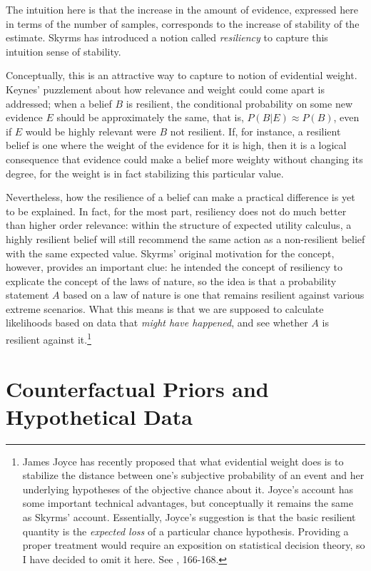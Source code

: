 The intuition here is that the increase in the amount of evidence,
expressed here in terms of the number of samples, corresponds to the
increase of stability of the estimate. Skyrms has introduced a notion
called \emph{resiliency} to capture this intuition sense of
stability.

Conceptually, this is an attractive way to capture to notion of
evidential weight. Keynes' puzzlement about how relevance and weight
could come apart is addressed; when a belief \(B\) is resilient, the
conditional probability on some new evidence \(E\) should be
approximately the same, that is, \(P(B|E) \approx P(B)\), even if \(E\)
would be highly relevant were \(B\) not resilient. If, for instance, a
resilient belief is one where the weight of the evidence for it is high,
then it is a logical consequence that evidence could make a belief more
weighty without changing its degree, for the weight is in fact
stabilizing this particular value.

Nevertheless, how the resilience of a belief can make a practical
difference is yet to be explained. In fact, for the most part,
resiliency does not do much better than higher order relevance: within
the structure of expected utility calculus, a highly resilient belief
will still recommend the same action as a non-resilient belief with the
same expected value. Skyrms' original motivation for the concept,
however, provides an important clue: he intended the concept of
resiliency to explicate the concept of the laws of nature, so the idea
is that a probability statement \(A\) based on a law of nature is one
that remains resilient against various extreme scenarios. What this
means is that we are supposed to calculate likelihoods based on data
that \emph{might have happened}, and see whether \(A\) is resilient
against it.\footnote{James Joyce has recently proposed that what evidential weight does is to stabilize the distance between one's subjective probability of an event and her underlying hypotheses of the objective chance about it. Joyce's account has some important technical advantages, but conceptually it remains the same as Skyrms' account. Essentially, Joyce's suggestion is that the basic resilient quantity is the \emph{expected loss} of a particular chance hypothesis. Providing a proper treatment would require an exposition on statistical decision theory, so I have decided to omit it here. See \cite{joycehpre}, 166-168.}



\hypertarget{counterfactual-priors-and-hypothetical-data-1}{%
\section{Counterfactual Priors and Hypothetical
Data}\label{counterfactual-priors-and-hypothetical-data-1}}

